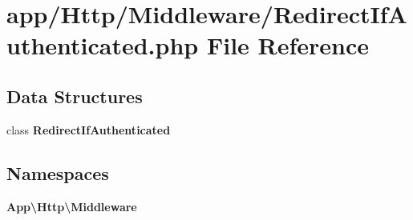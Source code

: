 \section{app/\+Http/\+Middleware/\+Redirect\+If\+Authenticated.php File Reference}
\label{_redirect_if_authenticated_8php}
\subsection*{Data Structures}
\begin{DoxyCompactItemize}
\item 
class {\bf Redirect\+If\+Authenticated}
\end{DoxyCompactItemize}
\subsection*{Namespaces}
\begin{DoxyCompactItemize}
\item 
 {\bf App\textbackslash{}\+Http\textbackslash{}\+Middleware}
\end{DoxyCompactItemize}
